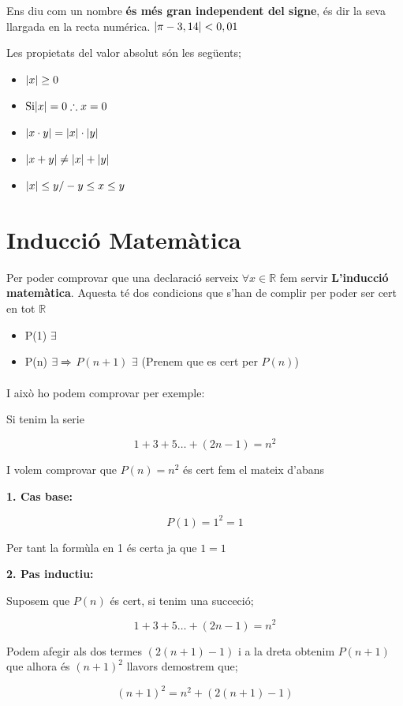 \documentclass[12pt]{article}
\newcommand{\R}{\mathbb{R}}
\begin{document}
Ens diu com un nombre \textbf{és més gran independent del signe}, és dir la seva llargada en la recta numérica. $\abs{\pi - 3,14} < 0,01$

Les propietats del valor absolut són les següents;

\begin{itemize}
    \item $\abs{x} \geq 0$
    \item $\text{Si} \abs{x} = 0 \therefore x = 0$
    \item $\abs{x\cdot y} = \abs{x} \cdot \abs{y}$
    \item $\abs{x+y} \neq \abs{x} + \abs{y}$
    \item $\abs{x} \leq y / -y \leq x \leq y $
\end{itemize}

\section{Inducció Matemàtica}

Per poder comprovar que una declaració serveix $\forall x \in \R$ fem servir \textbf{L'inducció matemàtica}. Aquesta té dos condicions que s'han de complir per poder ser cert en tot $\R$

\begin{itemize}
    \item P(1) $\exists$
    \item P(n) $\exists \xRightarrow{}$ $P(n+1)$ $\exists$ (Prenem que es cert per $P(n)$)
\end{itemize}

I això ho podem comprovar per exemple:

\begin{examplebox}{}
    Si tenim la serie

    \[ 1 + 3 + 5 \dots + (2n-1) = n^2 \]

    I volem comprovar que $P(n) = n^2$ és cert fem el mateix d'abans 

    \textbf{1. Cas base:}

    \[ P(1)=1^2 = 1 \]

    Per tant la formùla en 1 és certa ja que $1 = 1$

    \textbf{2. Pas inductiu:}

    Suposem que $P(n)$ és cert, si tenim una succeció;

    \[1+3+5\dots+(2n-1) = n^2\]

    Podem afegir als dos termes $(2(n+1) -1)$ i a la dreta obtenim $P(n+1)$ que alhora és $(n+1)^2$ llavors demostrem que;

    \[(n+1)^2 = n^2 + (2(n+1)-1)\]
\end{examplebox}
\end{document}
